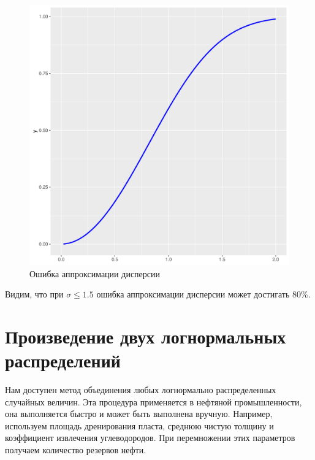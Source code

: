 \documentclass[12pt]{article}
\begin{document}
	\begin{figure}[h]
		\begin{center}
			\begin{minipage}[h]{0.5\linewidth}
				\includegraphics[width=1\linewidth]{img/s_sig.pdf}
				\caption{Ошибка аппроксимации дисперсии} %
				\label{ris:image2} %
			\end{minipage}
			
		\end{center}
	\end{figure}
	
	Видим, что при $\sigma\leq1.5$ ошибка аппроксимации дисперсии может достигать $80\%$. 
	
	\section{Произведение двух логнормальных распределений}
	Нам доступен метод объединения любых логнормально распределенных случайных величин. Эта процедура применяется в нефтяной промышленности, она выполняется быстро и может быть выполнена вручную. Например, используем площадь дренирования пласта, среднюю чистую толщину и коэффициент извлечения углеводородов. При перемножении этих параметров получаем количество резервов нефти.
	
\end{document}
